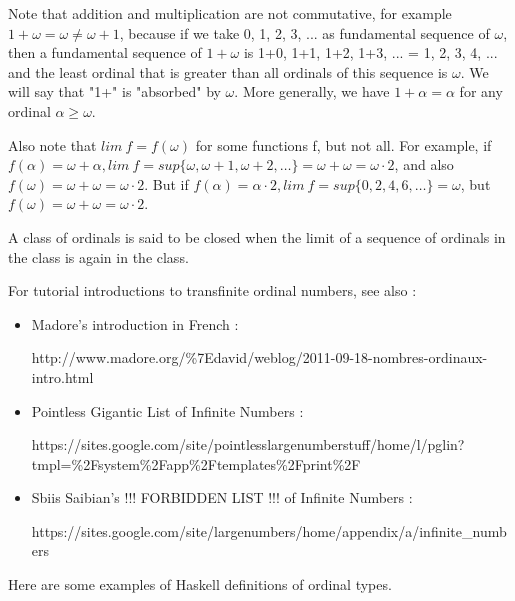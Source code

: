 \documentclass[10pt]{article}
\begin{document}
Note that addition and multiplication are not commutative, for example \( 1+\omega = \omega \neq \omega+1 \), because if we take 0, 1, 2, 3, ... as fundamental sequence of \( \omega \), then a fundamental sequence of \( 1+\omega \) is 1+0, 1+1, 1+2, 1+3, ... = 1, 2, 3, 4, ... and the least ordinal that is greater than all ordinals of this sequence is \( \omega \). We will say that "1+" is "absorbed" by \( \omega \). More generally, we have \( 1+\alpha = \alpha \) for any ordinal \( \alpha \geq \omega \).

\bigskip

Also note that \( lim\ f = f(\omega) \) for some functions f, but not all. For example, if \(f(\alpha) = \omega+\alpha, lim\ f = sup \lbrace \omega, \omega+1, \omega+2, \ldots \rbrace = \omega+\omega = \omega \cdot 2 \), and also \(f(\omega) = \omega+\omega = \omega \cdot 2 \). But if \( f(\alpha) = \alpha \cdot 2, lim\ f = sup \lbrace 0, 2, 4, 6, \ldots \rbrace = \omega \), but \(f(\omega) = \omega+\omega = \omega \cdot 2 \).

\bigskip

A class of ordinals is said to be closed when the limit of a sequence of ordinals in the class is again in the class.

\bigskip

For tutorial introductions to transfinite ordinal numbers, see also :

\begin{itemize}
     \setlength{\itemsep}{1pt}
     \setlength{\parskip}{0pt}
     \setlength{\parsep}{0pt}

\item Madore's introduction in French : 

 http://www.madore.org/\%7Edavid/weblog/2011-09-18-nombres-ordinaux-intro.html

\item Pointless Gigantic List of Infinite Numbers : 

 https://sites.google.com/site/pointlesslargenumberstuff/home/l/pglin?tmpl=\%2Fsystem\%2Fapp\%2Ftemplates\%2Fprint\%2F

\item Sbiis Saibian's !!! FORBIDDEN LIST !!! of Infinite Numbers : 

 https://sites.google.com/site/largenumbers/home/appendix/a/infinite\_numbers

\end{itemize}

Here are some examples of Haskell definitions of ordinal types.
\end{document}
